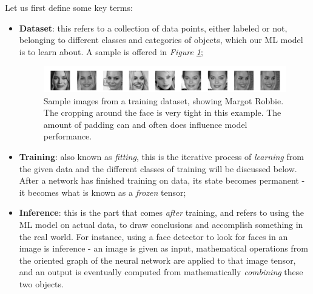 Let us first define some key terms:
\begin{itemize}
    \item \textbf{Dataset}: this refers to a collection of data points, either labeled or not, belonging to different classes and categories of objects, which our ML model is to learn about. A sample is offered in \textit{Figure \ref{margot_robbie_9}};
    \begin{figure}
        \centering
        \includegraphics{images/margot_robbie_good.png}
        \caption{Sample images from a training dataset, showing Margot Robbie. The cropping around the face is very tight in this example. The amount of padding can and often does influence model performance.}
        \label{margot_robbie_9}
    \end{figure}
    \item \textbf{Training}: also known as \textit{fitting}, this is the iterative process of \textit{learning} from the given data and the different classes of training will be discussed below. After a network has finished training on data, its state becomes permanent - it becomes what is known as a \textit{frozen} tensor;
    \item \textbf{Inference}: this is the part that comes \textit{after} training, and refers to using the ML model on actual data, to draw conclusions and accomplish something in the real world. For instance, using a face detector to look for faces in an image is inference - an image is given as input, mathematical operations from the oriented graph of the neural network are applied to that image tensor, and an output is eventually computed from mathematically \textit{combining} these two objects.
\end{itemize}



